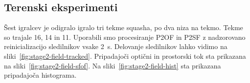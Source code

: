 \subsection{Terenski eksperimenti}
Šest igralcev je odigralo igralo tri tekme squasha, po dva niza na tekmo. Tekme so trajale \SI{16}{\min}, \SI{14}{\min} in \SI{11}{\min}. Uporabili smo procesiranje P2OF in P2SF  z nadzorovano reinicializacijo sledilnikov vsake \SI{2}{\s}. Delovanje sledilnikov lahko vidimo na sliki~\ref{fig:stage2-field-tracked}. Pripadajoči optični in prostorski tok sta prikazana na sliki~\ref{fig:stage2-field-sfof}. Na sliki~\ref{fig:stage2-field-hist} sta prikazana pripadajoča histograma.

